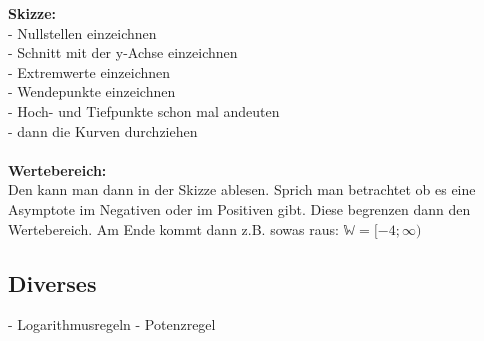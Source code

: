\documentclass[6pt,a4paper]{scrartcl}
\begin{document}
\begin{multicols*}{2}
\textbf{Skizze:}\\
- Nullstellen einzeichnen\\
- Schnitt mit der y-Achse einzeichnen\\
- Extremwerte einzeichnen\\
- Wendepunkte einzeichnen\\
- Hoch- und Tiefpunkte schon mal andeuten\\
- dann die Kurven durchziehen\\
\\
\textbf{Wertebereich:}\\
Den kann man dann in der Skizze ablesen. Sprich man betrachtet ob es eine Asymptote im Negativen oder im Positiven gibt. Diese begrenzen dann den Wertebereich. Am Ende kommt dann z.B. sowas raus: $\mathbb{W} = [-4; \infty)$
\subsection{Diverses}
- Logarithmusregeln
- Potenzregel

\end{multicols*}


\end{document}
